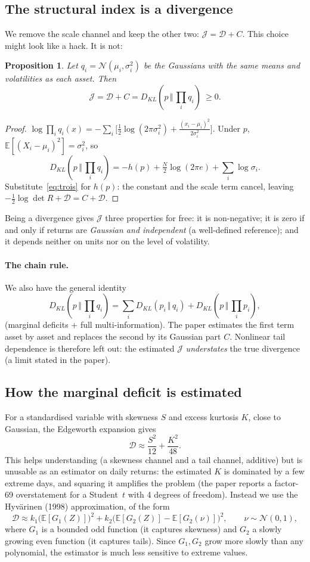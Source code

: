 \documentclass[11pt]{article}
\theoremstyle{plain}
\newtheorem{proposition}{Proposition}[section]
\theoremstyle{definition}
\theoremstyle{remark}
\newcommand{\JJ}{\mathcal{J}}
\newcommand{\DD}{\mathcal{D}}
\newcommand{\E}{\mathbb{E}}
\newcommand{\N}{\mathcal{N}}
\newcommand{\KL}[2]{D_{KL}\!\left(#1\,\Vert\,#2\right)}
\begin{document}
\subsection{The structural index is a divergence}

We remove the scale channel and keep the other two: $\JJ=\DD+C$. This choice
might look like a hack. It is not:

\begin{proposition}
\label{prop:J}
Let $q_i=\N(\mu_i,\sigma_i^2)$ be the Gaussians with the same means and
volatilities as each asset. Then
\[
\JJ=\DD+C=\KL{p}{\textstyle\prod_iq_i}\ \ge0 .
\]
\end{proposition}

\begin{proof}
$\log\prod_iq_i(x)=-\sum_i\bigl[\tfrac12\log(2\pi\sigma_i^2)
+\tfrac{(x_i-\mu_i)^2}{2\sigma_i^2}\bigr]$. Under $p$,
$\E[(X_i-\mu_i)^2]=\sigma_i^2$, so
\[
\KL{p}{\textstyle\prod_iq_i}=-h(p)+\tfrac N2\log(2\pi e)+\sum_i\log\sigma_i .
\]
Substitute~\eqref{eq:trois} for $h(p)$: the constant and the scale term
cancel, leaving $-\tfrac12\log\det R+\DD=C+\DD$.
\end{proof}

Being a divergence gives $\JJ$ three properties for free: it is
non-negative; it is zero if and only if returns are \emph{Gaussian and
independent} (a well-defined reference); and it depends neither on units nor
on the level of volatility.

\paragraph{The chain rule.} We also have the general identity
\[
\KL{p}{\textstyle\prod_iq_i}=\sum_i\KL{p_i}{q_i}+\KL{p}{\textstyle\prod_ip_i},
\]
(marginal deficits + full multi-information). The paper estimates the first
term asset by asset and replaces the second by its Gaussian part $C$.
Nonlinear tail dependence is therefore left out: the estimated $\JJ$
\emph{understates} the true divergence (a limit stated in the paper).

\subsection{How the marginal deficit is estimated}

For a standardised variable with skewness $S$ and excess kurtosis $K$, close
to Gaussian, the Edgeworth expansion gives
\[
\DD\approx\frac{S^2}{12}+\frac{K^2}{48}.
\]
This helps understanding (a skewness channel and a tail channel, additive)
but is unusable as an estimator on daily returns: the estimated $K$ is
dominated by a few extreme days, and squaring it amplifies the problem (the
paper reports a factor-69 overstatement for a Student~$t$ with 4 degrees of
freedom). Instead we use the Hyvärinen (1998) approximation, of the form
\[
\DD\approx k_1\bigl(\E[G_1(Z)]\bigr)^2+k_2\bigl(\E[G_2(Z)]-\E[G_2(\nu)]\bigr)^2,
\qquad\nu\sim\N(0,1),
\]
where $G_1$ is a bounded odd function (it captures skewness) and $G_2$ a
slowly growing even function (it captures tails). Since $G_1,G_2$ grow more
slowly than any polynomial, the estimator is much less sensitive to extreme
values.
\end{document}
